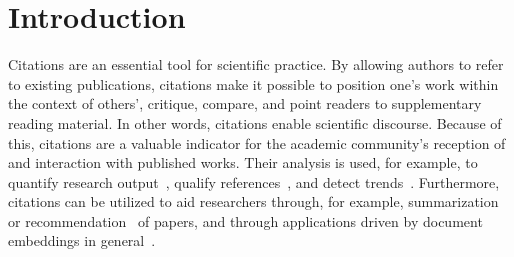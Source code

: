 
\section{Introduction}

Citations are an essential tool for scientific practice. By allowing authors to refer to existing publications, citations make it possible to position one's work within the context of others', critique, compare, and point readers to supplementary reading material. In other words, citations enable scientific discourse. Because of this, citations are a valuable indicator for the academic community's reception of and interaction with published works. Their analysis is used, for example, to quantify research output~\cite{Hirsch2005}, qualify references~\cite{Abujbara2013}, and detect trends~\cite{Chen2006}. Furthermore, citations can be utilized to aid researchers through, for example, summarization~\cite{Elkiss2008} or recommendation~\cite{Ma2020,Faerber2020a} of papers, and through applications driven by document embeddings in general~\cite{Cohan2020}.


